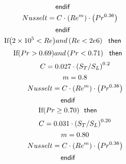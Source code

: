 \documentclass[10pt,fleqn]{article}
\newcommand{\K}[1]{\mbox{\sf#1\ \ \mit}}
\newcommand{\KS}[1]{\mbox{\sf\ \ #1\ \ \mit}}
\newcommand{\V}[1]{\mbox{$ #1 $}}
\newcommand{\I}{\mbox{\hspace{0.20in}}}
\begin{document}
\begin{equation}
\I \label{EES Eqn:268}
\K{endif} 
\end{equation}
\begin{equation}
\I \I \label{EES Eqn:269}
\V{Nusselt} =C\cdot  \left( \V{Re} ^{m} \right) \cdot  \left( \V{Pr} ^{0.36} \right)  
\end{equation}
\begin{equation}
\I \label{EES Eqn:270}
\K{endif} 
\end{equation}
\begin{equation}
\I \label{EES Eqn:271}
\mbox{If}{ \left( 2\times 10^{5}<\V{Re}  \right) } \V{and}   \left( \V{Re<2e6}  \right)  \KS{then} 
\end{equation}
\begin{equation}
\I \I \label{EES Eqn:272}
\mbox{If}{ \left( \V{Pr>0.69}  \right) } \V{and}   \left( \V{Pr<0.71}  \right)  \KS{then} 
\end{equation}
\begin{equation}
\I \I \I \label{EES Eqn:273}
C=0.027\cdot  \left( S_{T}/S_{L} \right) ^{0.2} 
\end{equation}
\begin{equation}
\I \I \I \label{EES Eqn:274}
m=0.8 
\end{equation}
\begin{equation}
\I \I \I \label{EES Eqn:275}
\V{Nusselt} =C\cdot  \left( \V{Re} ^{m} \right) \cdot  \left( \V{Pr} ^{0.36} \right) 	 
\end{equation}
\begin{equation}
\I \I \label{EES Eqn:276}
\K{endif} 
\end{equation}
\begin{equation}
\I \I \label{EES Eqn:277}
\mbox{If}{ \left( Pr\geq 0.70 \right) } \KS{then} 
\end{equation}
\begin{equation}
\I \I \I \label{EES Eqn:278}
C=0.031\cdot  \left( S_{T}/S_{L} \right) ^{0.20} 
\end{equation}
\begin{equation}
\I \I \I \label{EES Eqn:279}
m=0.80 
\end{equation}
\begin{equation}
\I \I \I \label{EES Eqn:280}
\V{Nusselt} =C\cdot  \left( \V{Re} ^{m} \right) \cdot  \left( \V{Pr} ^{0.36} \right) 	 
\end{equation}
\begin{equation}
\I \I \label{EES Eqn:281}
\K{endif} 
\end{equation}
\end{document}
